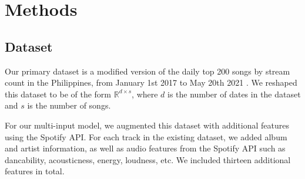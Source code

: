 \documentclass[11pt]{article}
\begin{document}
% 
% 
% 
% 
\section{Methods}

\subsection{Dataset}
Our primary dataset is a modified version of the daily top 200 songs by stream count in the Philippines, from January 1st 2017 to May 20th 2021 \cite{peralta_spotify_nodate}. We reshaped this dataset to be of the form $\mathbb{R}^{d \times s}$, where $d$ is the number of dates in the dataset and $s$ is the number of songs.

For our multi-input model, we augmented this dataset with additional features using the Spotify API. For each track in the existing dataset, we added album and artist information, as well as audio features from the Spotify API such as dancability, acousticness, energy, loudness, etc. We included thirteen additional features in total.
\end{document}
